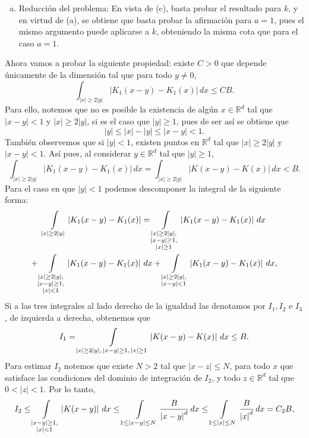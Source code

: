\documentclass{myarticle}
\newcommand{\abs}[1]{\left|{#1}\right|}
\newcommand{\abss}[1]{\vert #1 \vert}
\newcommand{\reales}{\mathbb{R}}
\begin{document}
{\begin{enumerate}[(a)]
    \item Reducción del problema:  En vista de (c), basta probar el resultado para $k$, y en virtud de (a), se obtiene que basta probar la afirmación para $a=1$, pues el mismo argumento puede aplicarse a $k$, obteniendo la misma cota que para el caso $a=1$.
\end{enumerate}
Ahora vamos a probar la siguiente propiedad: existe $C>0$ que depende únicamente de la dimensión tal que para todo $y\neq 0$, 
\begin{equation}\label{lem33.5}
\int_{\abs{x}\geq 2\abs{y}}\abss{K_1(x-y)-K_1(x)}\, dx\leq CB.
\end{equation}
Para ello, notemos que no es posible la existencia de algún $x\in\reales^d$ tal que $\abs{x-y}<1$ y $\abs{x}\geq 2\abs{y}$, si es el caso que $\abs{y}\geq 1$, pues de ser así se obtiene que
$$\abs{y}\leq\abs{x}-\abs{y}\leq\abs{x-y}<1.$$
También observemos que si $\abs{y}<1$, existen puntos en $\reales^d$ tal que $\abs{x}\geq 2\abs{y}$ y $\abs{x-y}<1$. Así pues, al considerar $y\in\reales^d$ tal que $\abs{y}\geq 1$,
$$\int_{\abs{x}\geq 2\abs{y}}\abss{K_1(x-y)-K_1(x)}\, dx=\int_{\abs{x}\geq 2\abs{y}}\abss{K(x-y)-K(x)}\, dx<B.$$
Para el caso en que $\abs{y}<1$ podemos descomponer la integral de la siguiente forma:
\begin{multline*}
\int\displaylimits_{\abs{x}\geq 2\abs{y}}\abss{K_1(x-y)-K_1(x)}=\int\displaylimits_{\substack{\abs{x}\geq 2\abs{y},\\ \abs{x-y}\geq 1,\\ \abs{x}\geq 1}}\abs{K_1(x-y)-K_1(x)}\, dx \\ 
+ \int\displaylimits_{\substack{\abs{x}\geq 2\abs{y},\\ \abs{x-y}\geq 1,\\ \abs{x}< 1}}\abs{K_1(x-y)-K_1(x)}\, dx+\int\displaylimits_{\substack{\abs{x}\geq 2\abs{y},\\ \abs{x-y}< 1}}\abs{K_1(x-y)-K_1(x)}\, dx,
\end{multline*}
Si a las tres integrales al lado derecho de la igualdad las denotamos por $I_1,I_2$ e $I_3$, de izquierda a derecha, obtenemos que 
$$
I_1=\int\displaylimits_{{\abs{x}\geq 2\abs{y},\, \abs{x-y}\geq 1,\,\abs{x}\geq 1}}\abs{K(x-y)-K(x)}\, dx\leq B.
$$
Para estimar $I_2$ notemos que existe $N>2$ tal que $\abs{x-z}\leq N$, para todo $x$ que satisface las condiciones del dominio de integración de $I_2$, y todo $z\in\reales^d$ tal que $0<\abs{z}< 1$. Por lo tanto,
$$I_2\leq\int\displaylimits_{\substack{\abs{x-y}\geq 1,\\ \abs{x}<1}}\abs{K(x-y)}\, dx\leq\int\displaylimits_{1\leq\abs{x-y}\leq N}\frac{B}{\abs{x-y}^d}\, dx\leq \int\displaylimits_{1\leq\abs{x}\leq N}\frac{B}{\abs{x}^d}\, dx=C_2B,$$
}
\end{document}
